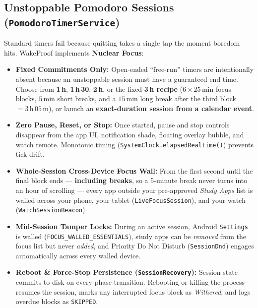 \documentclass[11pt,a4paper]{article}
\begin{document}
\subsection{Unstoppable Pomodoro Sessions (\texttt{PomodoroTimerService})}
Standard timers fail because quitting takes a single tap the moment boredom hits. WakeProof implements \textbf{Nuclear Focus}:
\begin{itemize}
  \item \textbf{Fixed Commitments Only:} Open-ended ``free-run'' timers are intentionally absent because an unstoppable session must have a guaranteed end time. Choose from \textbf{1\,h}, \textbf{1\,h\,30}, \textbf{2\,h}, or the fixed \textbf{3\,h recipe} ($6 \times 25\,\text{min}$ focus blocks, $5\,\text{min}$ short breaks, and a $15\,\text{min}$ long break after the third block $= 3\,\text{h}\,05\,\text{m}$), or launch an \textbf{exact-duration session from a calendar event}.
  \item \textbf{Zero Pause, Reset, or Stop:} Once started, pause and stop controls disappear from the app UI, notification shade, floating overlay bubble, and watch remote. Monotonic timing (\texttt{SystemClock.elapsedRealtime()}) prevents tick drift.
  \item \textbf{Whole-Session Cross-Device Focus Wall:} From the first second until the final block ends --- \textbf{including breaks}, so a 5-minute break never turns into an hour of scrolling --- every app outside your pre-approved \emph{Study Apps} list is walled across your phone, your tablet (\texttt{LiveFocusSession}), and your watch (\texttt{WatchSessionBeacon}).
  \item \textbf{Mid-Session Tamper Locks:} During an active session, Android \texttt{Settings} is walled (\texttt{FOCUS\_WALLED\_ESSENTIALS}), study apps can be \emph{removed} from the focus list but never \emph{added}, and Priority Do Not Disturb (\texttt{SessionDnd}) engages automatically across every walled device.
  \item \textbf{Reboot \& Force-Stop Persistence (\texttt{SessionRecovery}):} Session state commits to disk on every phase transition. Rebooting or killing the process resumes the session, marks any interrupted focus block as \emph{Withered}, and logs overdue blocks as \texttt{SKIPPED}.
\end{itemize}
\end{document}
